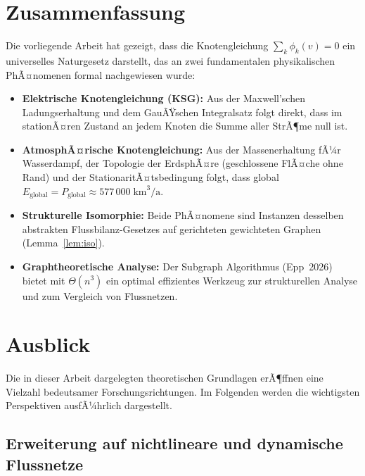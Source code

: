 ﻿\documentclass[a4paper,12pt]{article}
\theoremstyle{definition}
\begin{document}
\section{Zusammenfassung}

Die vorliegende Arbeit hat gezeigt, dass die Knotengleichung
$\sum_k \phi_k(v) = 0$ ein universelles Naturgesetz darstellt, das
an zwei fundamentalen physikalischen PhÃ¤nomenen formal nachgewiesen wurde:

\begin{itemize}
  \item \textbf{Elektrische Knotengleichung (KSG):} Aus der
    Maxwell'schen Ladungserhaltung und dem GauÃŸschen Integralsatz folgt
    direkt, dass im stationÃ¤ren Zustand an jedem Knoten die Summe aller
    StrÃ¶me null ist.
  \item \textbf{AtmosphÃ¤rische Knotengleichung:} Aus der Massenerhaltung
    fÃ¼r Wasserdampf, der Topo\-logie der ErdsphÃ¤re (geschlossene FlÃ¤che ohne
    Rand) und der StationaritÃ¤tsbedingung folgt, dass global
    $E_\mathrm{global} = P_\mathrm{global} \approx 577\,000\;\text{km}^3/\text{a}$.
  \item \textbf{Strukturelle Isomorphie:} Beide PhÃ¤nomene sind Instanzen
    desselben abstrakten Flussbilanz-Gesetzes auf gerichteten gewichteten
    Graphen (Lemma~\ref{lem:iso}).
  \item \textbf{Graphtheoretische Analyse:} Der Subgraph Algorithmus
    (Epp~2026) bietet mit $\Theta(n^3)$ ein optimal effizientes Werkzeug
    zur strukturellen Analyse und zum Vergleich von Flussnetzen.
\end{itemize}

\section{Ausblick}

Die in dieser Arbeit dargelegten theoretischen Grundlagen erÃ¶ffnen eine
Vielzahl bedeutsamer Forschungsrichtungen. Im Folgenden werden die
wichtigsten Perspektiven ausfÃ¼hrlich dargestellt.

\subsection{Erweiterung auf nichtlineare und dynamische Flussnetze}
\end{document}
